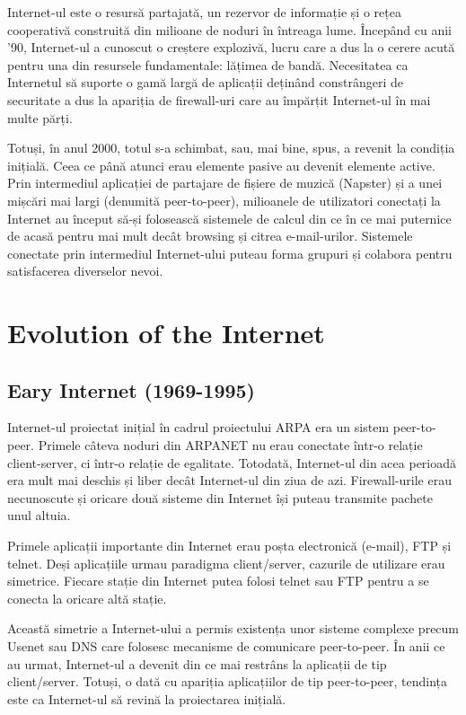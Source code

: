 Internet-ul este o resursă partajată, un rezervor de informație și o rețea
cooperativă construită din milioane de noduri în întreaga lume. Începând cu
anii '90, Internet-ul a cunoscut o creștere explozivă, lucru care a dus la o
cerere acută pentru una din resursele fundamentale: lățimea de bandă.
Necesitatea ca Internetul să suporte o gamă largă de aplicații deținând
constrângeri de securitate a dus la apariția de firewall-uri care au împărțit
Internet-ul în mai multe părți.

Totuși, în anul 2000, totul s-a schimbat, sau, mai bine, spus, a revenit la
condiția inițială. Ceea ce până atunci erau elemente pasive au devenit
elemente active. Prin intermediul aplicației de partajare de fișiere de muzică
(Napster) și a unei mișcări mai largi (denumită peer-to-peer), milioanele de
utilizatori conectați la Internet au început să-și folosească sistemele de
calcul din ce în ce mai puternice de acasă pentru mai mult decât browsing și
citrea e-mail-urilor. Sistemele conectate prin intermediul Internet-ului
puteau forma grupuri și colabora pentru satisfacerea diverselor nevoi.

\section{Evolution of the Internet}
\label{sec:p2p-systems:evolution-internet}

\subsection{Eary Internet (1969-1995)}

Internet-ul proiectat inițial în cadrul proiectului ARPA era un sistem
peer-to-peer. Primele câteva noduri din ARPANET nu erau conectate într-o
relație client-server, ci într-o relație de egalitate. Totodată, Internet-ul
din acea perioadă era mult mai deschis și liber decât Internet-ul din ziua de
azi. Firewall-urile erau necunoscute și oricare două sisteme din Internet își
puteau transmite pachete unul altuia.

Primele aplicații importante din Internet erau poșta electronică (e-mail), FTP
și telnet. Deși aplicațiile urmau paradigma client/server, cazurile de
utilizare erau simetrice. Fiecare stație din Internet putea folosi telnet sau
FTP pentru a se conecta la oricare altă stație.

Această simetrie a Internet-ului a permis existența unor sisteme complexe
precum Usenet sau DNS care folosesc mecanisme de comunicare peer-to-peer. În
anii ce au urmat, Internet-ul a devenit din ce mai restrâns la aplicații de
tip client/server. Totuși, o dată cu apariția aplicațiilor de tip
peer-to-peer, tendința este ca Internet-ul să revină la proiectarea inițială.

